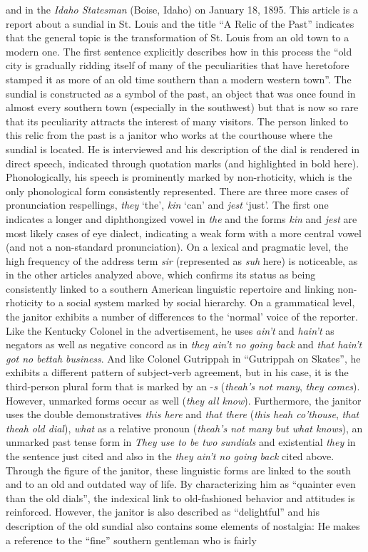 and in the \emph{Idaho Statesman} (Boise, Idaho) on January 18, 1895. This article is a report about a sundial in St. Louis and the title “A Relic of the Past” indicates that the general topic is the transformation of St. Louis from an old town to a modern one. The first sentence explicitly describes how in this process the “old city is gradually ridding itself of many of the peculiarities that have heretofore stamped it as more of an old time southern than a modern western town”. The sundial is constructed as a symbol of the past, an object that was once found in almost every southern town (especially in the southwest) but that is now so rare that its peculiarity attracts the interest of many visitors. The person linked to this relic from the past is a janitor who works at the courthouse where the sundial is located. He is interviewed and his description of the dial is rendered in direct speech, indicated through quotation marks (and highlighted in bold here). Phonologically, his speech is prominently marked by non-rhoticity, which is the only phonological form consistently represented. There are three more cases of pronunciation respellings, \emph{they} ‘the’, \emph{kin} ‘can’ and \emph{jest} ‘just’. The first one indicates a longer and diphthongized vowel in \emph{the} and the forms \emph{kin} and \emph{jest} are most likely cases of eye dialect, indicating a weak form with a more central vowel (and not a non-standard pronunciation). On a lexical and pragmatic level, the high frequency of the address term \emph{sir} (represented as \emph{suh} here) is noticeable, as in the other articles analyzed above, which confirms its status as being consistently linked to a southern American linguistic repertoire and linking non-rhoticity to a social system marked by social hierarchy. On a grammatical level, the janitor exhibits a number of differences to the ‘normal’ voice of the reporter. Like the Kentucky Colonel in the advertisement, he uses \emph{ain’t} and \emph{hain’t} as negators as well as negative concord as in \emph{they ain’t no going back} and \emph{that hain’t got no bettah business}. And like Colonel Gutrippah in “Gutrippah on Skates”, he exhibits a different pattern of subject-verb agreement, but in his case, it is the third-person plural form that is marked by an -\emph{s} (\emph{theah’s not many}, \emph{they comes}). However, unmarked forms occur as well (\emph{they all know}). Furthermore, the janitor uses the double demonstratives \emph{this here} and \emph{that there} (\emph{this heah co’thouse}, \emph{that theah old dial}), \emph{what} as a relative pronoun (\emph{theah’s not many but what knows}), an unmarked past tense form in \emph{They use to be two sundials} and existential \emph{they} in the sentence just cited and also in the \emph{they ain’t no going back} cited above. Through the figure of the janitor, these linguistic forms are linked to the south and to an old and outdated way of life. By characterizing him as “quainter even than the old dials”, the indexical link to old-fashioned behavior and attitudes is reinforced. However, the janitor is also described as “delightful” and his description of the old sundial also contains some elements of nostalgia: He makes a reference to the “fine” southern gentleman who is fairly 